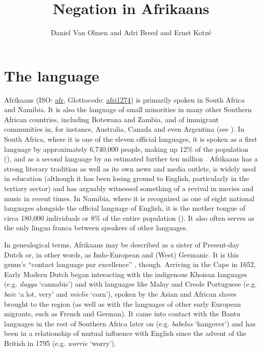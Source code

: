 \documentclass[output=paper,colorlinks,citecolor=brown]{langscibook}
\author{Daniel Van Olmen\affiliation{Lancaster University} and Adri Breed\affiliation{North-West University Potchefstroom} and Ernst Kotzé\affiliation{Nelson Mandela University Port Elizabeth}}
\title{Negation in Afrikaans}
\begin{document}
 
\maketitle 

\section{The language} 
\label{sec:afr:1}
Afrikaans (ISO: \href{https://iso639-3.sil.org/code/afr}{afr}, Glottocode: \href{https://glottolog.org/resource/languoid/id/afri1274}{afri1274}) is primarily spoken in South Africa and Namibia. It is also the language of small minorities in many other Southern African countries, including Botswana and Zambia, and of immigrant communities in, for instance, Australia, Canada and even Argentina (see \citealt{Toit1995}). In South Africa, where it is one of the eleven official languages, it is spoken as a first language by approximately 6,740,000 people, making up 12\% of the population (\citealt{StatisticsSouthAfrica2016}), and as a second language by an estimated further ten million \citep[78]{Webb2002}. Afrikaans has a strong literary tradition as well as its own news and media outlets, is widely used in education (although it has been losing ground to English, particularly in the tertiary sector) and has arguably witnessed something of a revival in movies and music in recent times. In Namibia, where it is recognized as one of eight national languages alongside the official language of English, it is the mother tongue of circa 180,000 individuals or 8\% of the entire population (\cite{UN2014}). It also often serves as the only lingua franca between speakers of other languages.

In genealogical terms, Afrikaans may be described as a sister of Present-day Dutch or, in other words, as Indo-European and (West) Germanic. It is this genus’s “contact language par excellence” \citep[72]{McWhorter2007}, though. Arriving in the Cape in 1652, Early Modern Dutch began interacting with the indigenous Khoisan languages (e.g. \textit{dagga} ‘cannabis’) and with languages like Malay and Creole Portuguese (e.g. \textit{baie} ‘a lot, very’ and \textit{mielie} ‘corn’), spoken by the Asian and African slaves brought to the region (as well as with the languages of other early European migrants, such as French and German). It came into contact with the Bantu languages in the rest of Southern Africa later on (e.g. \textit{babelas} ‘hangover’) and has been in a relationship of mutual influence with English since the advent of the British in 1795 (e.g. \textit{worrie} ‘worry’). 
\end{document}
